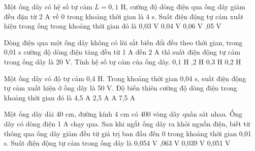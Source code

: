 \begin{vidu}%
Một ống dây có hệ số tự cảm $L = 0,1$ H, cường độ dòng điện qua ống dây giảm đều đặn từ 2 A về 0 trong khoảng thời gian là 4 s. Suất điện động tự cảm xuất hiện trong ống trong khoảng thời gian đó là
\choice
{0,03 V}
{0,04 V}
{0,06 V}
{,05 V}
\end{vidu}
\begin{vidu}%
Dòng điện qua một ống dây không có lõi sắt biến đổi đều theo thời gian, trong 0,01 s cường độ dòng điện tăng đều từ 1 A đến 2 A thì suất điện động tự cảm trong ống dây là 20 V. Tính hệ số tự cảm của ống dây.
\choice
{0,1 H}
{,2 H}
{0,3 H}
{0,2 H}
\end{vidu}
\begin{vidu}%
Một ống dây có độ tự cảm 0,4 H. Trong khoảng thời gian 0,04 s, suất điện động tự cảm xuất hiện ở ống dây là 50 V. Độ biến thiên cường độ dòng điện trong khoảng thời gian đó là
\choice
{4,5 A}
{2,5 A}
{ A}
{7,5 A}
\end{vidu}
\begin{vidu}%
Một ống dây dài 40 cm, đường kính 4 cm có 400 vòng dây quấn sát nhau. Ống dây có dòng điện 1 A chạy qua. Sau khi ngắt ống dây ra khỏi nguồn điện, biết từ thông qua ống dây giảm đều từ giá trị ban đầu đến 0 trong khoảng thời gian 0,01 s. Suất điện động tự cảm trong ống dây là
\choice
{0,054 V}
{,063 V}
{0,039 V}
{0,051 V}
\end{vidu}
